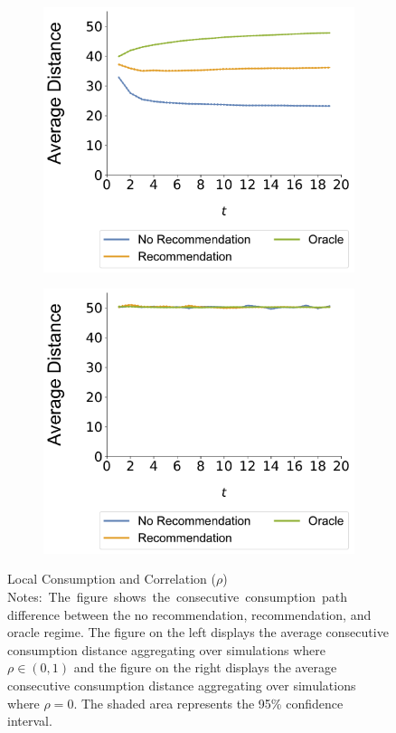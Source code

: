 \documentclass[sigconf]{acmart}
\begin{document}
\begin{figure}%
\begin{subfigure}{.42\linewidth}
  \centering
  \includegraphics[width=1.0\linewidth]{figures/rho_pos_consumption_dist_N_200T_20_overall.pdf}
  \label{fig:sfig1}
\end{subfigure}%
\hspace{20pt}
\begin{subfigure}{.42\linewidth}
  \centering
  \includegraphics[width=1.0\linewidth]{figures/rho_zero_consumption_dist_N_200T_20_overall.pdf}
  \label{fig:sfig2}
\end{subfigure}
\caption{Local Consumption and Correlation ($\rho$)\hfill\break
\scriptsize{Notes:~The~figure~shows~the~consecutive~consumption~path difference between the no recommendation, recommendation, and oracle regime. The figure on the left displays the average consecutive consumption distance aggregating over simulations where $\rho \in (0,1)$ and the figure on the right displays the average consecutive consumption distance aggregating over simulations where $\rho = 0$. The shaded area represents the 95\% confidence interval.}}
\label{fig:correlation_consumption_path}
\end{figure}
\end{document}
